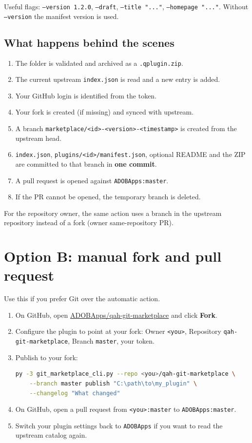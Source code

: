 \documentclass[11pt,a4paper]{article}
\newcommand{\code}[1]{\texttt{#1}}
\newcommand{\repo}{\href{https://github.com/ADOBApps/qah-git-marketplace}{ADOBApps/qah-git-marketplace}}
\begin{document}
Useful flags: \code{--version 1.2.0}, \code{--draft}, \code{--title "..."},
\code{--homepage "..."}. Without \code{--version} the manifest version is used.

\subsection{What happens behind the scenes}

\begin{enumerate}[leftmargin=1.5em]
  \item The folder is validated and archived as a \code{.qplugin.zip}.
  \item The current upstream \code{index.json} is read and a new entry is added.
  \item Your GitHub login is identified from the token.
  \item Your fork is created (if missing) and synced with upstream.
  \item A branch \code{marketplace/<id>-<version>-<timestamp>} is created from
        the upstream head.
  \item \code{index.json}, \code{plugins/<id>/manifest.json}, optional README and
        the ZIP are committed to that branch in \textbf{one commit}.
  \item A pull request is opened against \code{ADOBApps:master}.
  \item If the PR cannot be opened, the temporary branch is deleted.
\end{enumerate}

For the repository owner, the same action uses a branch in the upstream
repository instead of a fork (owner same-repository PR).

\section{Option B: manual fork and pull request}

Use this if you prefer Git over the automatic action.

\begin{enumerate}[leftmargin=1.5em]
  \item On GitHub, open \repo{} and click \textbf{Fork}.
  \item Configure the plugin to point at your fork:
        Owner \code{<you>}, Repository \code{qah-git-marketplace},
        Branch \code{master}, your token.
  \item Publish to your fork:
\begin{lstlisting}[language=bash,caption={Publish to your fork}]
py -3 git_marketplace_cli.py --repo <you>/qah-git-marketplace \
    --branch master publish "C:\path\to\my_plugin" \
    --changelog "What changed"
\end{lstlisting}
  \item On GitHub, open a pull request from \code{<you>:master} to
        \code{ADOBApps:master}.
  \item Switch your plugin settings back to \code{ADOBApps} if you want to read
        the upstream catalog again.
\end{enumerate}
\end{document}
